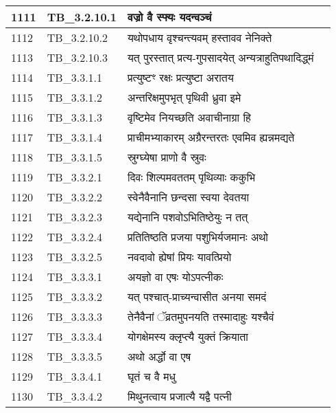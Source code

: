 \documentclass[17pt]{extarticle}
\begin{document}
\begin{longtable}{||p{0.4in}||p{0.9in}||p{4.0in}||p{0.9in}||}
        \hline
            1111 & TB\_3.2.10.1 & वज्रो वै स्फ्यः यदन्वञ्चं &      \\
        \hline
            1112 & TB\_3.2.10.2 & यथोपधाय वृश्चन्त्यवम् हस्तावव नेनिक्ते &      \\
        \hline
            1113 & TB\_3.2.10.3 & यत् पुरस्तात् प्रत्य{-}गुपसादयेत् अन्यत्राहुतिपथादिद्ध्मं &      \\
        \hline
            1114 & TB\_3.3.1.1 & प्रत्युष्टꣳ रक्षः प्रत्युष्टा अरातय &      \\
        \hline
            1115 & TB\_3.3.1.2 & अन्तरिक्षमुपभृत् पृथिवी ध्रुवा इमे &      \\
        \hline
            1116 & TB\_3.3.1.3 & वृष्टिमेव नियच्छति अवाचीनाग्रा हि &      \\
        \hline
            1117 & TB\_3.3.1.4 & प्राचीमभ्याकारम् अग्रैरन्तरतः एवमिव ह्यन्नमद्यते &      \\
        \hline
            1118 & TB\_3.3.1.5 & स्रुग्घ्येषा प्राणो वै स्रुवः &      \\
        \hline
            1119 & TB\_3.3.2.1 & दिवः शिल्पमवततम् पृथिव्याः ककुभि &      \\
        \hline
            1120 & TB\_3.3.2.2 & स्वेनैवैनानि छन्दसा स्वया देवतया &      \\
        \hline
            1121 & TB\_3.3.2.3 & यद्येनानि पशवोऽभितिष्ठेयुः न तत् &      \\
        \hline
            1122 & TB\_3.3.2.4 & प्रतितिष्ठति प्रजया पशुभिर्यजमानः अथो &      \\
        \hline
            1123 & TB\_3.3.2.5 & नवदावो ह्येषां प्रियः यावत्प्रियो &      \\
        \hline
            1124 & TB\_3.3.3.1 & अयज्ञो वा एषः योऽपत्नीकः &      \\
        \hline
            1125 & TB\_3.3.3.2 & यत् पश्चात्{-}प्राच्यन्वासीत अनया समदं &      \\
        \hline
            1126 & TB\_3.3.3.3 & तेनैवैनां ॅव्रतमुपनयति तस्मादाहुः यश्चैवं &      \\
        \hline
            1127 & TB\_3.3.3.4 & योगक्षेमस्य क्लृप्त्यै युक्तं क्रियाता &      \\
        \hline
            1128 & TB\_3.3.3.5 & अथो अर्द्धो वा एष &      \\
        \hline
            1129 & TB\_3.3.4.1 & घृतं च वै मधु &      \\
        \hline
            1130 & TB\_3.3.4.2 & मिथुनत्वाय प्रजात्यै यद्वै पत्नी &      \\

\end{longtable}
\end{document}
